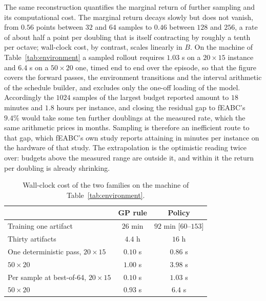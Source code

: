 \documentclass[preprint,authoryear,12pt]{elsarticle}
\theoremstyle{definition}
\theoremstyle{remark}
\begin{document}
The same reconstruction quantifies the marginal return of further
sampling and its computational cost. The marginal return decays
slowly but does not vanish, from $0.56$ points between $32$ and $64$
samples to $0.46$ between $128$ and $256$, a rate of about half a
point per doubling that is itself contracting by roughly a tenth per
octave; wall-clock cost, by contrast, scales linearly in $B$. On the
machine of Table~\ref{tab:environment} a sampled rollout requires
$1.03$ s on a $20{\times}15$ instance and $6.4$ s on a
$50{\times}20$ one, timed end to end over the episode, so that the
figure covers the forward passes, the environment transitions and the
interval arithmetic of the schedule builder, and excludes only the
one-off loading of the model. Accordingly the $1024$ samples of the
largest budget reported amount to $18$ minutes and $1.8$ hours per
instance, and closing the residual gap to fEABC's $9.4\%$ would take
some ten further doublings at the measured rate, which the same
arithmetic prices in months. Sampling is therefore an inefficient
route to that gap, which fEABC's own study reports attaining in
minutes per instance on the hardware of that study. The extrapolation
is the optimistic reading twice over: budgets above the measured
range are outside it, and within it the return per doubling is
already shrinking.

\begin{table}[!htb]
\centering\small
\caption{Wall-clock cost of the two families on the machine of
Table~\ref{tab:environment}.}
\label{tab:cost}
\begin{tabular}{lcc}
\toprule
 & GP rule & Policy \\
\midrule
Training one artifact & $26$ min & $92$ min [$60$--$153$] \\
Thirty artifacts & $4.4$ h & $16$ h \\
\addlinespace
One deterministic pass, $20{\times}15$ & $0.10$ s & $0.86$ s \\
\phantom{One deterministic pass, }$50{\times}20$ & $1.00$ s & $3.98$ s \\
Per sample at best-of-64, $20{\times}15$ & $0.10$ s & $1.03$ s \\
\phantom{Per sample at best-of-64, }$50{\times}20$ & $0.93$ s & $6.4$ s \\
\bottomrule
\end{tabular}
\end{table}
\end{document}
